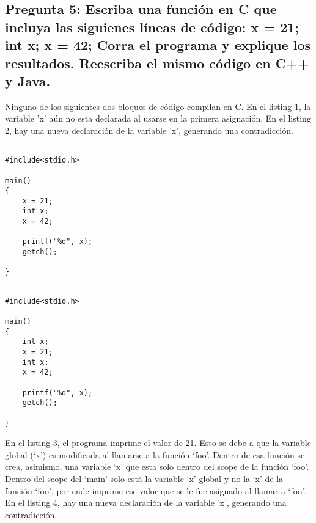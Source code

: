 \subsection{Pregunta 5: Escriba una función en C que incluya las siguienes líneas de código: \newline
x = 21; \newline
int x; \newline
x = 42; \newline
Corra el programa y explique los resultados. Reescriba el mismo código en C++ y Java.}

Ninguno de los siguientes dos bloques de código compilan en C. En el listing 1, la variable 'x' aún no esta declarada al usarse en la primera asignación.
En el listing 2, hay una nueva declaración de la variable 'x', generando una contradicción.

\lstset{language=C}          %

\begin{lstlisting}[caption= Pregunta 5 Capítulo 5, label=amb, frame=single]  % Start your code-block
  
#include<stdio.h>

main()
{
	x = 21;
	int x;
	x = 42;

	printf("%d", x);
	getch();

}
\end{lstlisting}
\begin{lstlisting}[caption= Pregunta 5 Capítulo 5, label=amb, frame=single]  % Start your code-block
  
#include<stdio.h>

main()
{
	int x;
	x = 21;
	int x;
	x = 42;

	printf("%d", x);
	getch();

}
\end{lstlisting}

En el listing 3, el programa imprime el valor de 21. Esto se debe a que la variable global (‘x’) es modificada al llamarse a la función ‘foo’. Dentro de esa función se crea, asimismo, una variable ‘x’ que esta solo dentro del scope de la función ‘foo’. Dentro del scope del ‘main’ solo está la variable ‘x’ global y no la ‘x’ de la función ‘foo’, por ende imprime ese valor que se le fue asignado al llamar a ‘foo’.
En el listing 4, hay una nueva declaración de la variable 'x', generando una contradicción.

\lstset{language=C++}          %

